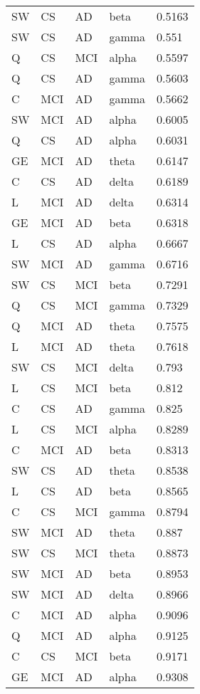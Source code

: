\begin{center}
\begin{longtable}{|l|l|l|l|l|}
					SW & CS  & AD  & beta  & 0.5163 \\
					SW & CS  & AD  & gamma & 0.551  \\
					Q  & CS  & MCI & alpha & 0.5597 \\
					Q  & CS  & AD  & gamma & 0.5603 \\
					C  & MCI & AD  & gamma & 0.5662 \\
					SW & MCI & AD  & alpha & 0.6005 \\
					Q  & CS  & AD  & alpha & 0.6031 \\
					GE & MCI & AD  & theta & 0.6147 \\
					C  & CS  & AD  & delta & 0.6189 \\
					L  & MCI & AD  & delta & 0.6314 \\
					GE & MCI & AD  & beta  & 0.6318 \\
					L  & CS  & AD  & alpha & 0.6667 \\
					SW & MCI & AD  & gamma & 0.6716 \\
					SW & CS  & MCI & beta  & 0.7291 \\
					Q  & CS  & MCI & gamma & 0.7329 \\
					Q  & MCI & AD  & theta & 0.7575 \\
					L  & MCI & AD  & theta & 0.7618 \\
					SW & CS  & MCI & delta & 0.793  \\
					L  & CS  & MCI & beta  & 0.812  \\
					C  & CS  & AD  & gamma & 0.825  \\
					L  & CS  & MCI & alpha & 0.8289 \\
					C  & MCI & AD  & beta  & 0.8313 \\
					SW & CS  & AD  & theta & 0.8538 \\
					L  & CS  & AD  & beta  & 0.8565 \\
					C  & CS  & MCI & gamma & 0.8794 \\
					SW & MCI & AD  & theta & 0.887  \\
					SW & CS  & MCI & theta & 0.8873 \\
					SW & MCI & AD  & beta  & 0.8953 \\
					SW & MCI & AD  & delta & 0.8966 \\
					C  & MCI & AD  & alpha & 0.9096 \\
					Q  & MCI & AD  & alpha & 0.9125 \\
					C  & CS  & MCI & beta  & 0.9171 \\
					GE & MCI & AD  & alpha & 0.9308 \\

\end{longtable}
\end{center}
